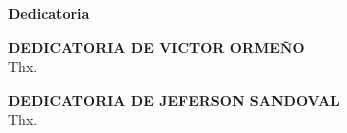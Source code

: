 \begin{center}
	{\large \bfseries  Dedicatoria}
\end{center}
\vspace{0.5cm}
\textbf{DEDICATORIA DE VICTOR ORMEÑO}
\\
Thx.

\textbf{DEDICATORIA DE JEFERSON SANDOVAL}
\\
Thx.
\newline

